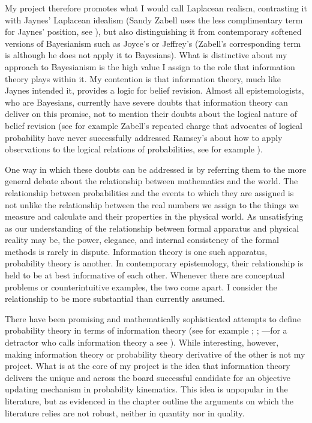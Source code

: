 \documentclass[11pt]{article}
\begin{document}
My project therefore promotes what I would call Laplacean realism,
contrasting it with Jaynes' Laplacean idealism (Sandy Zabell uses the
less complimentary term  for Jaynes'
position, see ), but also distinguishing it
from contemporary softened versions of Bayesianism such as Joyce's or
Jeffrey's (Zabell's corresponding term is 
although he does not apply it to Bayesians). What is distinctive about
my approach to Bayesianism is the high value I assign to the role that
information theory plays within it. My contention is that information
theory, much like Jaynes intended it, provides a logic for belief
revision. Almost all epistemologists, who are Bayesians, currently
have severe doubts that information theory can deliver on this
promise, not to mention their doubts about the logical nature of
belief revision (see for example Zabell's repeated charge that
advocates of logical probability have never successfully addressed
Ramsey's  about how to apply observations to
the logical relations of probabilities, see for example
).

One way in which these doubts can be addressed is by referring them to
the more general debate about the relationship between mathematics and
the world. The relationship between probabilities and the events to
which they are assigned is not unlike the relationship between the
real numbers we assign to the things we measure and calculate and
their properties in the physical world. As unsatisfying as our
understanding of the relationship between formal apparatus and
physical reality may be, the power, elegance, and internal consistency
of the formal methods is rarely in dispute. Information theory is one
such apparatus, probability theory is another. In contemporary
epistemology, their relationship is held to be at best informative of
each other. Whenever there are conceptual problems or counterintuitive
examples, the two come apart. I consider the relationship to be more
substantial than currently assumed.

There have been promising and mathematically sophisticated attempts to
define probability theory in terms of information theory (see for
example ; ;
---for a detractor who calls information theory a
 see
). 
While interesting, however, making information theory or probability
theory derivative of the other is not my project. What is at the core
of my project is the idea that information theory delivers the unique
and across the board successful candidate for an objective updating
mechanism in probability kinematics. This idea is unpopular in the
literature, but as evidenced in the chapter outline the arguments on
which the literature relies are not robust, neither in quantity nor in
quality.
\end{document}
